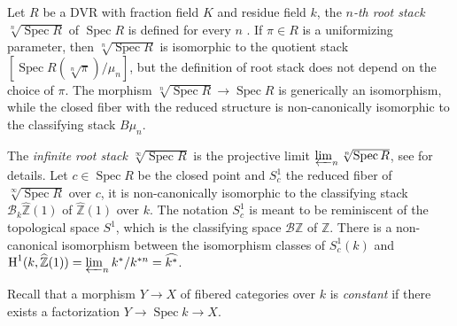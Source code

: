 \documentclass[11pt]{amsart}
\theoremstyle{plain}
\theoremstyle{definition}
\newcommand{\on}{\operatorname}
\newcommand{\1}{\mathbb{1}}
\newcommand{\C}{\mathbb{C}}
\newcommand{\hz}{\hat{\mathbb{Z}}}
\newcommand{\spec}{\on{Spec}}
\newcommand{\Z}{\mathbb{Z}}
\renewcommand{\H}{\on{H}}
\renewcommand{\projlim}{\varprojlim}
\renewcommand{\hat}{\widehat}
\newcommand\cB{\mathcal{B}}
\begin{document}




Let $R$ be a DVR with fraction field $K$ and residue field $k$, the \emph{$n$-th root stack} $\sqrt[n]{\spec R}$ of $\spec R$ is defined for every $n$ \cite[Appendix B]{agv08}. If $\pi\in R$ is a uniformizing parameter, then $\sqrt[n]{\spec R}$ is isomorphic to the quotient stack $[\spec R(\sqrt[n]{\pi})/\mu_{n}]$, but the definition of root stack does not depend on the choice of $\pi$. The morphism $\sqrt[n]{\spec R}\to \spec R$ is generically an isomorphism, while the closed fiber with the reduced structure is non-canonically isomorphic to the classifying stack $B\mu_{n}$.

The \emph{infinite root stack} $\sqrt[\infty]{\spec R}$ is the projective limit $\projlim_{n}\sqrt[n]{\spec R}$, see \cite{tv18} for details. Let $c\in\spec R$ be the closed point and $S^{1}_{c}$ the reduced fiber of $\sqrt[\infty]{\spec R}$ over $c$, it is non-canonically isomorphic to the classifying stack $\cB_{k}\hz(1)$ of $\hz(1)$ over $k$. The notation $S^{1}_{c}$ is meant to be reminiscent of the topological space $S^{1}$, which is the classifying space $\mathcal{B}\Z$ of $\Z$. There is a non-canonical isomorphism between the isomorphism classes of $S^{1}_{c}(k)$ and $\H^{1}(k,\hz(1))=\projlim_{n}k^*/k^{*n}=\hat{k^*}$.

Recall that a morphism $Y\to X$ of fibered categories over $k$ is \emph{constant} if there exists a factorization $Y\to\spec k\to X$.
\end{document}
